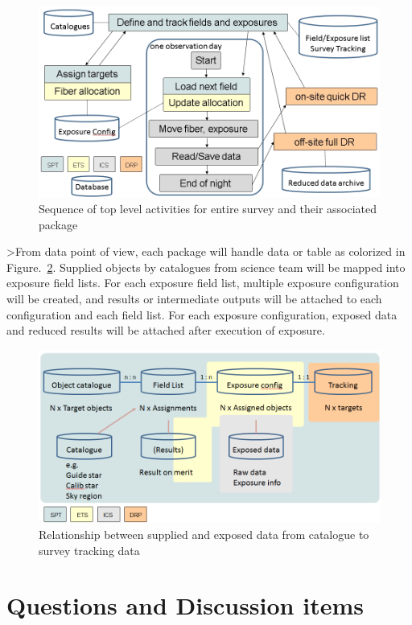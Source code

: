 \documentclass[a4paper,notitlepage]{article}
\begin{document}
\begin{figure}[htb]
  \begin{center}
    \includegraphics[width=.75\linewidth]{sciops-scireq-slide-softcoord.png}
  \end{center}
  \caption{Sequence of top level activities for entire survey and 
    their associated package}
  \label{fig:sciops-scireq-slide-softcoord}
\end{figure}

>From data point of view, each package will handle data or table as colorized 
in Figure.~\ref{fig:sciops-scireq-slide-data}. 
Supplied objects by catalogues from science team will be mapped into 
exposure field lists. For each exposure field list, multiple exposure 
configuration will be created, and results or intermediate outputs 
will be attached to each configuration and each field list. 
For each exposure configuration, exposed data and reduced results will be 
attached after execution of exposure. 

\begin{figure}[htb]
  \begin{center}
    \includegraphics[width=.75\linewidth]{sciops-scireq-slide-data.png}
  \end{center}
  \caption{Relationship between supplied and exposed data from catalogue to 
    survey tracking data}
  \label{fig:sciops-scireq-slide-data}
\end{figure}

\section{Questions and Discussion items}
\end{document}
